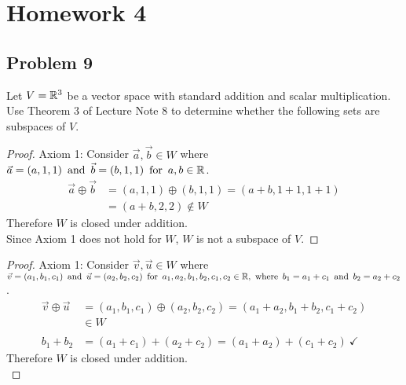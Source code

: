 





\section*{Homework 4}

\subsection*{Problem 9}
Let $V = \mathbb{R}^3$ be a vector space with standard addition and scalar multiplication. Use Theorem 3 of Lecture Note 8 to determine whether the following sets are subspaces of $V$.
\begin{enumerate}
  \begin{proof}
    Axiom 1: Consider $\vec{a},\vec{b} \in W$ where $\vec{a} = (a,1,1) \operatorname{~\text{and}~} \vec{b} = (b,1,1) \operatorname{~\text{for}~} a,b \in \mathbb{R}$.
    \begin{align*}
      \vec{a} \oplus \vec{b} & = (a,1,1) \oplus (b,1,1) = (a+b,1+1,1+1) \\
                             & = (a+b,2,2) \not \in W
    \end{align*}
    Therefore $W$ is  closed under addition. \\
    Since Axiom 1 does not hold for $W$, $W$ is not a subspace of $V$.
  \end{proof}
  \begin{proof}
    Axiom 1: Consider $\vec{v},\vec{u} \in W$ where $\vec{v} = (a_1,b_1,c_1) \operatorname{~\text{and}~} \vec{u} = (a_2,b_2,c_2) \operatorname{~\text{for}~} a_1,a_2,b_1,b_2,c_1,c_2 \in \mathbb{R}, \operatorname{~\text{where}~} b_1 = a_1 + c_1 \operatorname{~\text{and}~} b_2 = a_2 + c_2$.
    \begin{align*}
      \vec{v} \oplus \vec{u} & = (a_1,b_1,c_1) \oplus (a_2,b_2,c_2) = (a_1+a_2,b_1+b_2,c_1+c_2)   \\
                             & \in W                                                              \\ \\
      b_1 + b_2              & = (a_1 + c_1) + (a_2 + c_2) = (a_1 + a_2) + (c_1 + c_2)~\checkmark
    \end{align*}
    Therefore $W$ is closed under addition. \\

\end{proof}
\end{enumerate}

